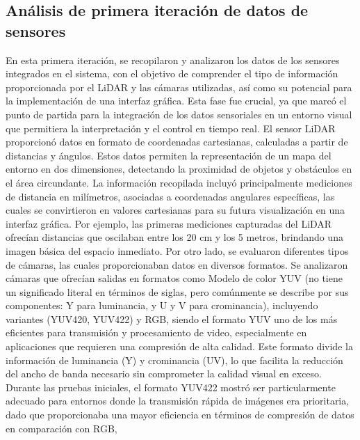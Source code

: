\subsection{An\'alisis de primera iteraci\'on de datos de sensores } %
    En esta primera iteraci\'on, se recopilaron y analizaron los datos de los sensores 
        integrados en el sistema, con el objetivo de comprender el tipo de informaci\'on 
        proporcionada por el LiDAR y las c\'amaras utilizadas, as\'i como su potencial para la 
        implementaci\'on de una interfaz gr\'afica. Esta fase fue crucial, ya que marc\'o el punto 
        de partida para la integraci\'on de los datos sensoriales en un entorno visual que permitiera 
        la interpretaci\'on y el control en tiempo real.
    \vskip 0.5cm
    El sensor LiDAR proporcion\'o datos en formato de coordenadas cartesianas, calculadas a 
        partir de distancias y \'angulos. Estos datos permiten la representaci\'on de un mapa 
        del entorno en dos dimensiones, detectando la proximidad de objetos y obst\'aculos 
        en el \'area circundante. La informaci\'on recopilada incluy\'o principalmente mediciones 
        de distancia en mil\'imetros, asociadas a coordenadas angulares espec\'ificas, las cuales 
        se convirtieron en valores cartesianas para su futura visualizaci\'on en una interfaz gr\'afica. 
        Por ejemplo, las primeras mediciones capturadas del LiDAR ofrec\'ian distancias que oscilaban 
        entre los 20 cm y los 5 metros, brindando una imagen b\'asica del espacio inmediato.
    \vskip 0.5cm
    Por otro lado, se evaluaron diferentes tipos de c\'amaras, las cuales proporcionaban datos en diversos 
        formatos. Se analizaron c\'amaras que ofrec\'ian salidas en formatos como Modelo de color YUV 
        (no tiene un significado literal en t\'erminos de siglas, pero com\'unmente se describe por sus componentes: 
        Y para luminancia, y U y V para crominancia), incluyendo variantes (YUV420, YUV422) y 
        RGB, siendo el formato YUV uno de los m\'as eficientes para transmisi\'on y procesamiento de video, 
        especialmente en aplicaciones que requieren una compresi\'on de alta calidad. Este formato divide la 
        informaci\'on de luminancia (Y) y crominancia (UV), lo que facilita la reducci\'on del ancho de banda 
        necesario sin comprometer la calidad visual en exceso. Durante las pruebas iniciales, el formato YUV422 
        mostr\'o ser particularmente adecuado para entornos donde la transmisi\'on r\'apida de im\'agenes era prioritaria, 
        dado que proporcionaba una mayor eficiencia en t\'erminos de compresi\'on de datos en comparaci\'on con RGB, 
